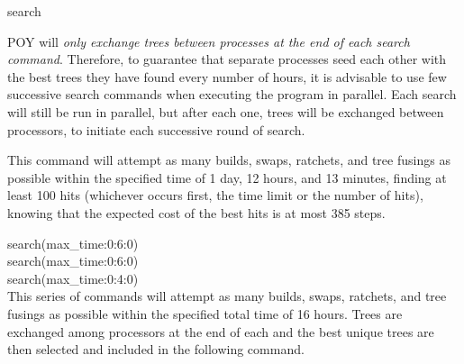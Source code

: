 \begin{command}{search}{}
\begin{statement}
                POY will \emph{only exchange trees between processes at the end
                of each search command}. Therefore,
                to guarantee that separate processes seed each other with the
                best trees they have found every number of hours,
                it is advisable to use few successive search commands
                when executing the program in parallel. Each search will still
                be run in parallel, but after each one, trees will be exchanged
                between processors, to initiate each successive round of search.
        \end{statement}

        
    	\begin{poyexamples}
        	
            {This command will attempt as many builds, swaps, ratchets, and tree
            fusings as possible within the specified time of 1 day, 12 hours, and 13
            minutes, finding at least 100 hits (whichever occurs first, the time
            limit or the number of hits), knowing that the expected cost of the
            best hits is at most 385 steps.}
	
            {{search(max\_time:0:6:0)}\\
	                      {search(max\_time:0:6:0)}\\
	                      {search(max\_time:0:4:0)}\\
            {This series of commands will attempt as many builds, swaps, ratchets, and tree
            fusings as possible within the specified total time of 16 hours.  Trees are exchanged among
             processors at the end of each  and the best unique trees
              are then selected and included in the following
               command.}}
            \end{poyexamples}

	\begin{poyalso}
	\end{poyalso}

\end{command}

